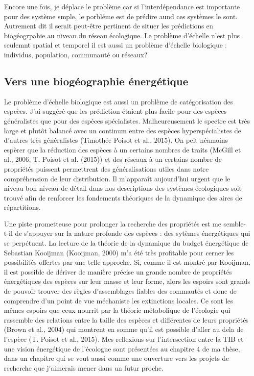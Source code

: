 Encore une fois, je déplace le problème car si l'interdépendance est
importante pour des système smple, le porblème est de prédire aund ces
systèmes le sont. Autrement dit il serait peut-être pertinent de situer
les prédictions en biogéogrpahie au niveau du réseau écologique. Le
problème d'échelle n'est plus seulemnt spatial et temporel il est aussi
un problème d'échelle biologique : individus, population, communauté ou
réseaux?

\subsection*{Vers une biogéographie
énergétique}\label{vers-une-bioguxe9ographie-uxe9nerguxe9tique}

Le problème d'échelle biologique est aussi un problème de catégorisation
des espcèes. J'ai suggéré que les prédiction étaient plus facile pour
des espèces généralistes que pour des espèces spécialistes.
Malheureusement le spectre est très large et plutôt balancé avec un
continum entre des espèces hyperspécialistes de d'autres très
généralistes (Timothée Poisot et al., 2015). On peit néamoins espèrer
que la réduction des espèces à un certains nombres de traits (McGill et
al., 2006, T. Poisot et al. (2015)) et des réseaux à un certains nombre
de propriétés puissent permettrent des généralisations utiles dans notre
compréhension de leur distribution. Il m'apparaît aujourd'hui urgent que
le niveau bon niveau de détail dans nos descriptions des systèmes
écologiques soit trouvé afin de renforcer les fondements théoriques de
la dynamique des aires de répartitions.

Une piste prometteuse pour prolonger la recherche des propriétés est me
semble-t-il de s'appuyer sur la nature profonde des espèces : des
sytèmes énergétiques qui se perpétuent. La lecture de la théorie de la
dynamique du budget énergétique de Sebastian Kooijman (Kooijman, 2000)
m'a été très profitable pour cerner les possibilités offertes par une
telle approche. Si, comme il est montré par Kooijman, il est possible de
dériver de manière précise un grande nombre de propriétés énergétiques
des espèces sur leur masse et leur forme, alors les espoirs sont grands
de pouvoir trouver des règles d'assemblages fiables des commautés et
donc de comprendre d'un point de vue méchaniste les extinctions locales.
Ce sont les mêmes espoirs que ceux nourrit par la théorie métabolique de
l'écologie qui rassemble des relations entre la taille des espèces et
différentes de leurs propriétés (Brown et al., 2004) qui montrent en
somme qu'il est possible d'aller au dela de l'espèce (T. Poisot et al.,
2015). Mes reflexions sur l'intersection entre la TIB et une vision
énergétique de l'écologue sont présentées au chapitre 4 de ma thèse,
dans un chapitre qui se veut aussi comme une ouverture vers les projets
de recherche que j'aimerais mener dans un futur proche.

